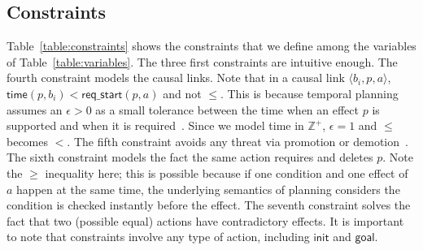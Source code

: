 \documentclass[runningheads]{llncs}
\newcommand{\tup}[1]{{\langle #1 \rangle}}
\newcommand{\dur}{\mathsf{dur}}    %
\newcommand{\obs}{\mathsf{obs}}    %
\newcommand{\start}{\mathsf{start}}%
\newcommand{\til}{\mathsf{til}}    %
\newcommand{\tim}{\mathsf{time}}   %
\newcommand{\reqs}{\mathsf{req\_{start}}} %
\newcommand{\ini}{\mathsf{init}}   %
\newcommand{\goal}{\mathsf{goal}}  %
\begin{document}


\subsection{Constraints}

Table~\ref{table:constraints} shows the constraints that we define among the variables of Table~\ref{table:variables}. The three first constraints are intuitive enough. The fourth constraint models the causal links. Note that in a causal link $\tup{b_i,p,a}$, $\tim(p,b_i) < \reqs(p,a)$ and not $\leq$. This is because temporal planning assumes an $\epsilon > 0$ as a small tolerance between the time when an effect $p$ is supported and when it is required~\cite{fox2003pddl2}. Since we model time in $\mathbb{Z}^+$, $\epsilon=1$ and $\leq$ becomes $<$.
The fifth constraint avoids any threat via promotion or demotion~\cite{ghallab2004automated}. The sixth constraint models the fact the same action requires and deletes $p$. Note the $\geq$ inequality here; this is possible because if one condition and one effect of $a$ happen at the same time, the underlying semantics of planning considers the condition is checked instantly before the effect. The seventh constraint solves the fact that two (possible equal) actions have contradictory effects. It is important to note that constraints involve any type of action, including $\ini$ and $\goal$.


\end{document}
